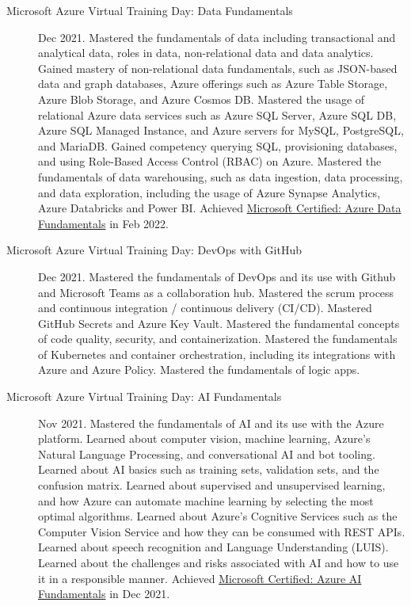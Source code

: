 \documentclass{article}
\begin{document}
\begin{description}
  \item [Microsoft Azure Virtual Training Day: Data Fundamentals] Dec 2021. Mastered the fundamentals of data including transactional and analytical data, roles in data, non-relational data and data analytics. Gained mastery of non-relational data fundamentals, such as JSON-based data and graph databases, Azure offerings such as Azure Table Storage, Azure Blob Storage, and Azure Cosmos DB. Mastered the usage of relational Azure data services such as Azure SQL Server, Azure SQL DB, Azure SQL Managed Instance, and Azure servers for MySQL, PostgreSQL, and MariaDB. Gained competency querying SQL, provisioning databases, and using Role-Based Access Control (RBAC) on Azure. Mastered the fundamentals of data warehousing, such as data ingestion, data processing, and data exploration, including the usage of Azure Synapse Analytics, Azure Databricks and Power BI. Achieved \href{https://www.credly.com/badges/677cac34-dc29-4535-ba97-6d4c81ccf19e/public_url}{Microsoft Certified: Azure Data Fundamentals} in Feb 2022.
  \item [Microsoft Azure Virtual Training Day: DevOps with GitHub] Dec 2021. Mastered the fundamentals of DevOps and its use with Github and Microsoft Teams as a collaboration hub. Mastered the scrum process and continuous integration / continuous delivery (CI/CD). Mastered GitHub Secrets and Azure Key Vault. Mastered the fundamental concepts of code quality, security, and containerization. Mastered the fundamentals of Kubernetes and container orchestration, including its integrations with Azure and Azure Policy. Mastered the fundamentals of logic apps.
  \item [Microsoft Azure Virtual Training Day: AI Fundamentals] Nov 2021. Mastered the fundamentals of AI and its use with the Azure platform. Learned about computer vision, machine learning, Azure's Natural Language Processing, and conversational AI and bot tooling. Learned about AI basics such as training sets, validation sets, and the confusion matrix. Learned about supervised and unsupervised learning, and how Azure can automate machine learning by selecting the most optimal algorithms. Learned about Azure's Cognitive Services such as the Computer Vision Service and how they can be consumed with REST APIs. Learned about speech recognition and Language Understanding (LUIS). Learned about the challenges and risks associated with AI and how to use it in a responsible manner. Achieved \href{https://www.credly.com/badges/fa66cf6b-dff5-4f58-9f4e-4b94fc91b7fa/public_url}{Microsoft Certified: Azure AI Fundamentals} in Dec 2021.

\end{description}
\end{document}
